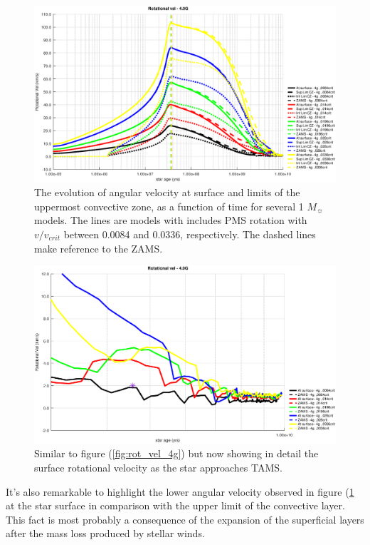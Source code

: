 \documentclass[fleqn,usenatbib]{mnras}
\begin{document}
\begin{figure}
	\includegraphics[width=\columnwidth]{figures/rot_vel_cz_4g.eps}
    \caption{The evolution of angular velocity at surface and limits of the uppermost convective zone, as a function of time for several 1 $M_{\sun}$ models. The lines are models with includes PMS rotation with $v/v_{crit}$ between 0.0084 and 0.0336, respectively. The dashed lines make reference to the ZAMS.}
    \label{fig:rot_vel_cz_4g}
\end{figure}

\begin{figure}
	\includegraphics[width=\columnwidth]{figures/rot_vel_4g_z1.eps}
    \caption{Similar to figure (\ref{fig:rot_vel_4g}) but now showing in detail the surface rotational velocity as the star approaches TAMS.}
    \label{fig:rot_vel_4g_z1}
\end{figure}

It's also remarkable to highlight the lower angular velocity observed in figure (\ref{fig:rot_vel_cz_4g} at the star surface in comparison with the upper limit of the convective layer. This fact is most probably a consequence of the expansion of the superficial layers after the mass loss produced by stellar winds.\par
\end{document}
